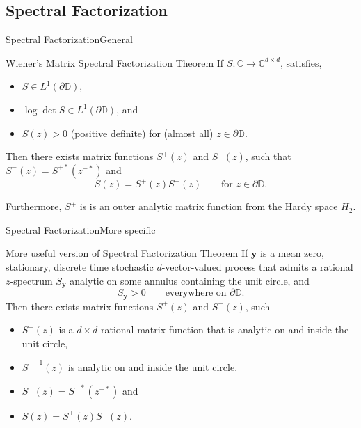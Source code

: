 \documentclass{beamer}  %
\newcommand{\D}{\mathbb{D}}
\newcommand{\C}{\mathbb{C}}
\begin{document}
\subsection{Spectral Factorization}
\begin{frame}{Spectral Factorization}{General}
	
	\begin{block}{Wiener's Matrix Spectral Factorization Theorem}
		If $S:\C \rightarrow \C^{d \times d}$, satisfies,
		\begin{itemize}
			\item $S \in L^1(\partial\D)$,
			\item $\log\det S \in L^1(\partial\D)$, and 
			\item $S(z) > 0$ (positive definite) for (almost all) $z \in \partial\D$.
		\end{itemize}
		Then there exists matrix functions $S^+(z)$ and $S^-(z)$, such that $S^-(z) = S^{+*}(z^{-*})$ and $$S(z) =S^+(z)S^-(z)\qquad \text{for }z\in \partial\D.$$
		
		Furthermore, $S^+$ is is an outer analytic matrix function from the Hardy space $H_2$. 
	\end{block}
	
\end{frame}

\begin{frame}{Spectral Factorization}{More specific}
	
	\begin{block}{More useful version of Spectral Factorization Theorem}
		If $\textbf{y}$ is a mean zero, stationary, discrete time stochastic $d$-vector-valued process that admits a rational $z$-spectrum $S_{\textbf{y}}$ analytic on some annulus containing the unit circle,  and $$S_{\textbf{y}} > 0 \qquad \text{everywhere on } \partial\D.$$ Then there exists matrix functions $S^+(z)$ and $S^-(z)$, such 
		\begin{itemize}
			\item $S^+(z)$ is a $d\times d$ rational matrix function that is analytic on and inside the unit circle,
			\item ${S^+}^{-1}(z)$ is analytic on and inside the unit circle.
			\item $S^-(z) = S^{+*}(z^{-*})$ and 
			\item $S(z) =S^+(z)S^-(z)$.	
		\end{itemize}
	\end{block}
	
\end{frame}
\end{document}
